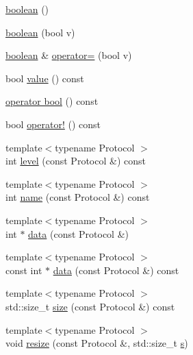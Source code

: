 \begin{DoxyCompactItemize}
\item 
\hyperlink{classasio_1_1detail_1_1socket__option_1_1boolean_ac9313534e1db45c51bfee3b4ab16fae1}{boolean} ()
\item 
\hyperlink{classasio_1_1detail_1_1socket__option_1_1boolean_a23b0c3038cf06c3cd7430fef2f886ace}{boolean} (bool v)
\item 
\hyperlink{classasio_1_1detail_1_1socket__option_1_1boolean}{boolean} \& \hyperlink{classasio_1_1detail_1_1socket__option_1_1boolean_af433150a41e83b2135f32f2334521c43}{operator=} (bool v)
\item 
bool \hyperlink{classasio_1_1detail_1_1socket__option_1_1boolean_a6e2163ca7d706e9831d27eb3747ff214}{value} () const 
\item 
\hyperlink{classasio_1_1detail_1_1socket__option_1_1boolean_a79c5e0b922a4617962217b8fd1f98b05}{operator bool} () const 
\item 
bool \hyperlink{classasio_1_1detail_1_1socket__option_1_1boolean_a4a9c561a9630abbd9220cae55c7b7bdc}{operator!} () const 
\item 
{\footnotesize template$<$typename Protocol $>$ }\\int \hyperlink{classasio_1_1detail_1_1socket__option_1_1boolean_a945abe9132f684bc631dd6a2254b9b9d}{level} (const Protocol \&) const 
\item 
{\footnotesize template$<$typename Protocol $>$ }\\int \hyperlink{classasio_1_1detail_1_1socket__option_1_1boolean_ae8a5ad069747647864d6515c465508ad}{name} (const Protocol \&) const 
\item 
{\footnotesize template$<$typename Protocol $>$ }\\int $\ast$ \hyperlink{classasio_1_1detail_1_1socket__option_1_1boolean_acdfef39630b3d1441081a316b5dd0c24}{data} (const Protocol \&)
\item 
{\footnotesize template$<$typename Protocol $>$ }\\const int $\ast$ \hyperlink{classasio_1_1detail_1_1socket__option_1_1boolean_a421b037c226d9e750235c49515bcff1b}{data} (const Protocol \&) const 
\item 
{\footnotesize template$<$typename Protocol $>$ }\\std\+::size\+\_\+t \hyperlink{classasio_1_1detail_1_1socket__option_1_1boolean_ab3a8bfc8c7b95bbeb8150dc15758f8cb}{size} (const Protocol \&) const 
\item 
{\footnotesize template$<$typename Protocol $>$ }\\void \hyperlink{classasio_1_1detail_1_1socket__option_1_1boolean_a63205812ba17e87b2e17a334d31fb700}{resize} (const Protocol \&, std\+::size\+\_\+t \hyperlink{group__async__connect_ga31ab74b9ea6c77932dddd016cfc7920a}{s})
\end{DoxyCompactItemize}


